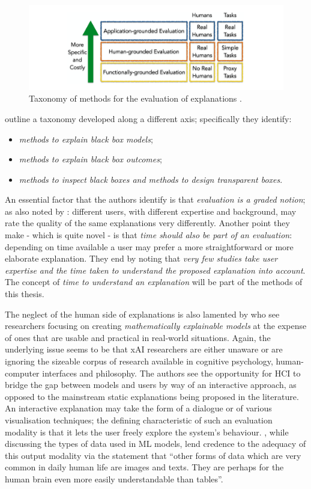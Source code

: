\begin{figure}[htbp]
\centerline{\includegraphics[width=\textwidth]{literature-review/images/xai-taxonomy}}
\caption{Taxonomy of methods for the evaluation of explanations \citep{doshi2017towards}.}
\label{fig:xai-taxonomy}
\end{figure}

\citet{guidotti2018survey} outline a taxonomy developed along a different axis; specifically they identify: 
\begin{itemize}
  \item \textit{methods to explain black box models};
  \item \textit{methods to explain black box outcomes};
  \item \textit{methods to inspect black boxes and methods to design transparent boxes}.
\end{itemize}
An essential factor that the authors identify is that \textit{evaluation is a graded notion}; as also noted by \citet{gilpin2018explaining}: different users, with different expertise and background, may rate the quality of the same explanations very differently.
Another point they make - which is quite novel - is that \textit{time should also be part of an evaluation}: depending on time available a user may prefer a more straightforward or more elaborate explanation.
They end by noting that \textit{very few studies take user expertise and the time taken to understand the proposed explanation into account}.
The concept of \textit{time to understand an explanation} will be part of the methods of this thesis.

The neglect of the human side of explanations is also lamented by \citet{abdul2018trends} who see researchers focusing on creating \textit{mathematically explainable models} at the expense of ones that are usable and practical in real-world situations.
Again, the underlying issue seems to be that xAI researchers are either unaware or are ignoring the sizeable corpus of research available in cognitive psychology, human-computer interfaces and philosophy.
The authors see the opportunity for HCI to bridge the gap between models and users by way of an interactive approach, as opposed to the mainstream static explanations being proposed in the literature.
An interactive explanation may take the form of a dialogue or of various visualisation techniques; the defining characteristic of such an evaluation modality is that it lets the user freely explore the system's behaviour.
\citet{guidotti2018survey}, while discussing the types of data used in ML models, lend credence to the adequacy of this output modality via the statement that \enquote{other forms of data which are very common in daily human life are images and texts. They are perhaps for the human brain even more easily understandable than tables}.

